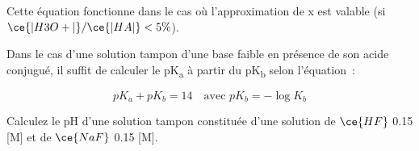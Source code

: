 \documentclass[
  11pt,
  french,
  a4paper,
  openany]{book}
\begin{document}
Cette équation fonctionne dans le cas où l'approximation de x est valable (si \(\ce{|H3O+|}/\ce{|HA|} < 5\%\)).

Dans le cas d'une solution tampon d'une base faible en présence de son acide conjugué, il suffit de calculer le pK\textsubscript{a} à partir du pK\textsubscript{b} selon l'équation~:

\[
pK_a + pK_b = 14 \quad \text{avec } pK_b = - \log K_b
\]

\clearpage

\begin{Exercise}
Calculez le pH d'une solution tampon constituée d'une solution de \(\ce{HF}\) 0.15 {[}M{]} et de \(\ce{NaF}\) 0.15 {[}M{]}.

\end{Exercise}
\end{document}
